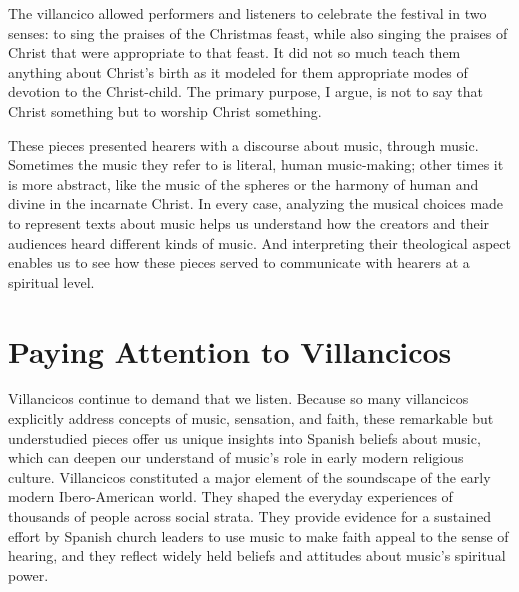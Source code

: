 The villancico allowed performers and listeners to celebrate the festival in two
senses: to sing the praises of the Christmas feast, while also singing the
praises of Christ that were appropriate to that feast. 
It did not so much teach them anything about Christ's birth as it modeled for
them appropriate modes of devotion to the Christ-child.
The primary purpose, I argue, is not to say that Christ  something but
to worship Christ  something.

These pieces presented hearers with a discourse about music, through music.
Sometimes the music they refer to is literal, human music-making; other times
it is more abstract, like the music of the spheres or the harmony of human and
divine in the incarnate Christ.
In every case, analyzing the musical choices made to represent texts about
music helps us understand how the creators and their audiences heard different
kinds of music.
And interpreting their theological aspect enables us to see how these pieces
served to communicate with hearers at a spiritual level.

\section{Paying Attention to Villancicos}

Villancicos continue to demand that we listen. 
Because so many villancicos explicitly address concepts of music, sensation,
and faith, these remarkable but understudied pieces offer us unique insights
into Spanish beliefs about music, which can deepen our understand of music's
role in early modern religious culture.
Villancicos constituted a major element of the soundscape of the
early modern Ibero-American world.
They shaped the everyday experiences of thousands of people across social
strata.
They provide evidence for a sustained effort by Spanish church leaders to use
music to make faith appeal to the sense of hearing, and they reflect widely
held beliefs and attitudes about music's spiritual power.

